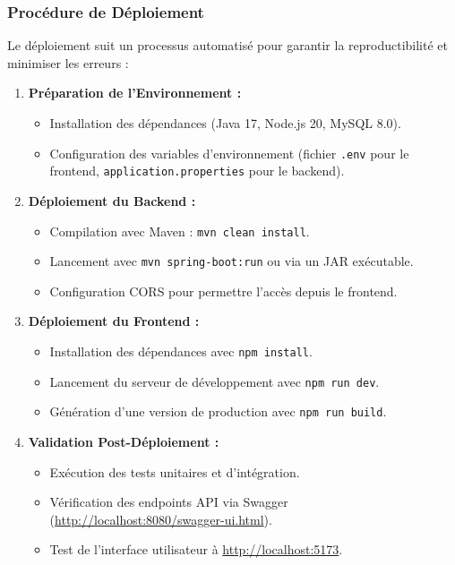 \documentclass[12pt,a4paper]{article}
\begin{document}
\subsubsection{Procédure de Déploiement}

Le déploiement suit un processus automatisé pour garantir la reproductibilité et minimiser les erreurs :

\begin{enumerate}
\item \textbf{Préparation de l'Environnement :}
\begin{itemize}
\item Installation des dépendances (Java 17, Node.js 20, MySQL 8.0).
\item Configuration des variables d'environnement (fichier \texttt{.env} pour le frontend, \texttt{application.properties} pour le backend).
\end{itemize}

\item \textbf{Déploiement du Backend :}
\begin{itemize}
\item Compilation avec Maven : \texttt{mvn clean install}.
\item Lancement avec \texttt{mvn spring-boot:run} ou via un JAR exécutable.
\item Configuration CORS pour permettre l'accès depuis le frontend.
\end{itemize}

\item \textbf{Déploiement du Frontend :}
\begin{itemize}
\item Installation des dépendances avec \texttt{npm install}.
\item Lancement du serveur de développement avec \texttt{npm run dev}.
\item Génération d'une version de production avec \texttt{npm run build}.
\end{itemize}

\item \textbf{Validation Post-Déploiement :}
\begin{itemize}
\item Exécution des tests unitaires et d'intégration.
\item Vérification des endpoints API via Swagger (\url{http://localhost:8080/swagger-ui.html}).
\item Test de l'interface utilisateur à \url{http://localhost:5173}.
\end{itemize}
\end{enumerate}
\end{document}
